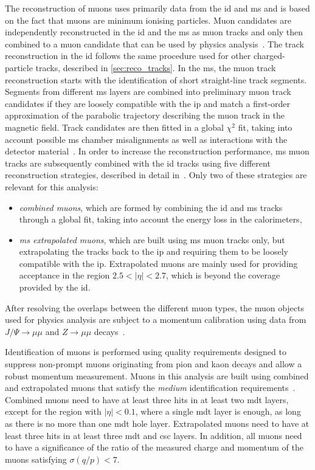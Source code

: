 The reconstruction of muons uses primarily data from the \gls{id} and \gls{ms} and is based on the fact that muons are minimum ionising particles. Muon candidates are independently reconstructed in the \gls{id} and the \gls{ms} as muon tracks and only then combined  to a muon candidate that can be used by physics analysis~\cite{PERF-2015-10,Aad:2020gmm}. The track reconstruction in the \gls{id} follows the same procedure used for other charged-particle tracks, described in \cref{sec:reco_tracks}. In the \gls{ms}, the muon track reconstruction starts with the identification of short straight-line track segments. Segments from different \gls{ms} layers are combined into preliminary muon track candidates if they are loosely compatible with the \gls{ip} and match a first-order approximation of the parabolic trajectory describing the muon track in the magnetic field. Track candidates are then fitted in a global $\chi^2$ fit, taking into account possible \gls{ms} chamber misalignments as well as interactions with the detector material~\cite{Aad:2020gmm}. In order to increase the reconstruction performance, \gls{ms} muon tracks are subsequently combined with the \gls{id} tracks using five different reconstruction strategies, described in detail in~\cite{Aad:2020gmm}. Only two of these strategies are relevant for this analysis:
\begin{itemize}
	\item \textit{combined muons}, which are formed by combining the \gls{id} and \gls{ms} tracks through a global fit, taking into account the energy loss in the calorimeters,
	\item \textit{\gls{ms} extrapolated muons}, which are built using \gls{ms} muon tracks only, but extrapolating the tracks back to the \gls{ip} and requiring them to be loosely compatible with the \gls{ip}. Extrapolated muons are mainly used for providing acceptance in the region $2.5 < \vert\eta\vert < 2.7$, which is beyond the coverage provided by the \gls{id}.
\end{itemize}
After resolving the overlaps between the different muon types, the muon objects used for physics analysis are subject to a momentum calibration using data from $J/\Psi\rightarrow\mu\mu$ and $Z\rightarrow\mu\mu$ decays~\cite{PERF-2015-10,Aad:2020gmm}.

Identification of muons is performed using quality requirements designed to suppress non-prompt muons originating from pion and kaon decays and allow a robust momentum measurement. Muons in this analysis are built using combined and extrapolated muons that satisfy the \textit{medium} identification requirements~\cite{PERF-2015-10}. Combined muons need to have at least three hits in at least two \gls{mdt} layers, except for the region with $\vert\eta\vert < 0.1$, where a single \gls{mdt} layer is enough, as long as there is no more than one \gls{mdt} hole layer. Extrapolated muons need to have at least three hits in at least three \gls{mdt} and \gls{csc} layers. In addition, all muons need to have a significance of the ratio of the measured charge and momentum of the muons satisfying $\sigma(q/p) < 7$.

